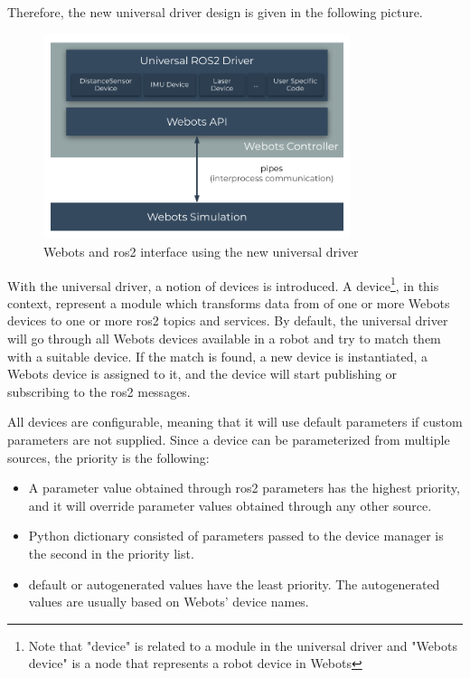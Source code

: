 Therefore, the new universal driver design is given in the following picture.
\begin{figure}[H]
    \centering
    \includegraphics[width=0.8\textwidth]{generalization/figures/universal_driver_within_webots.pdf}
    \caption{Webots and \ac{ros2} interface using the new universal driver}
    \label{fig:generalization:universal_driver_within_webots}
\end{figure}

With the universal driver, a notion of devices is introduced.
A device\footnote{Note that "device" is related to a module in the universal driver and "Webots device" is a node that represents a robot device in Webots}, in this context, represent a module which transforms data from of one or more Webots devices to one or more \ac{ros2} topics and services.
By default, the universal driver will go through all Webots devices available in a robot and try to match them with a suitable device.
If the match is found, a new device is instantiated, a Webots device is assigned to it, and the device will start publishing or subscribing to the \ac{ros2} messages.

All devices are configurable, meaning that it will use default parameters if custom parameters are not supplied.
Since a device can be parameterized from multiple sources, the priority is the following:
\begin{itemize}
    \item A parameter value obtained through \ac{ros2} parameters has the highest priority, and it will override parameter values obtained through any other source.
    \item Python dictionary consisted of parameters passed to the device manager is the second in the priority list.
    \item default or autogenerated values have the least priority. The autogenerated values are usually based on Webots' device names.
\end{itemize}

